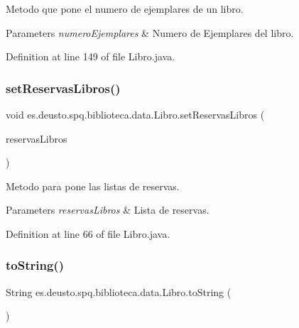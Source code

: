 Metodo que pone el numero de ejemplares de un libro. 
\begin{DoxyParams}{Parameters}
{\em numero\+Ejemplares} & Numero de Ejemplares del libro. \\
\hline
\end{DoxyParams}


Definition at line 149 of file Libro.\+java.

\mbox{\label{classes_1_1deusto_1_1spq_1_1biblioteca_1_1data_1_1_libro_aaee59e81f8e43abc1088ac306b812d89}} 
\subsubsection{\texorpdfstring{set\+Reservas\+Libros()}{setReservasLibros()}}
{\footnotesize\ttfamily void es.\+deusto.\+spq.\+biblioteca.\+data.\+Libro.\+set\+Reservas\+Libros (\begin{DoxyParamCaption}\item[{List$<$ \mbox{\hyperlink{classes_1_1deusto_1_1spq_1_1biblioteca_1_1data_1_1_reserva_libro}{Reserva\+Libro}} $>$}]{reservas\+Libros }\end{DoxyParamCaption})}

Metodo para pone las listas de reservas. 
\begin{DoxyParams}{Parameters}
{\em reservas\+Libros} & Lista de reservas. \\
\hline
\end{DoxyParams}


Definition at line 66 of file Libro.\+java.

\mbox{\label{classes_1_1deusto_1_1spq_1_1biblioteca_1_1data_1_1_libro_ac4ade112ff225403986255f1809221a7}} 
\subsubsection{\texorpdfstring{to\+String()}{toString()}}
{\footnotesize\ttfamily String es.\+deusto.\+spq.\+biblioteca.\+data.\+Libro.\+to\+String (\begin{DoxyParamCaption}{ }\end{DoxyParamCaption})}

